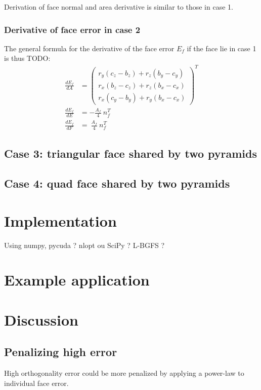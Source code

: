 \documentclass[11pt]{article}
\begin{document}
Derivation of face normal and area derivative is similar to those in case 1.

\subsubsection{Derivative of face error in case 2}
The general formula for the derivative of the face error $E_f$ if the face lie in case 1 is thus TODO:
\begin{subequations}
\begin{align}
\frac{d E_f}{d A} &= 
\begin{pmatrix}
r_y(c_z-b_z) + r_z(b_y-c_y)\\
r_x(b_z-c_z) + r_z(b_x-c_x) \\
r_x(c_y-b_y) + r_y(b_x-c_x)
\end{pmatrix}^T
 \\
\frac{d E_f}{d E} &= - \frac{A_f }{4}\ n_f^T \\
\frac{d E_f}{d F} &= \ \frac{A_f }{4}\ n_f^T
\end{align}
\end{subequations} 


\subsection{Case 3: triangular face shared by two pyramids}




\subsection{Case 4: quad face shared by two pyramids}



\section{Implementation}

Using numpy, pycuda ? nlopt ou SciPy ? L-BGFS ?


\section{Example application}



\section{Discussion}

\subsection{Penalizing high error}
High orthogonality error could be more penalized by applying a power-law to individual face error. 
\end{document}
